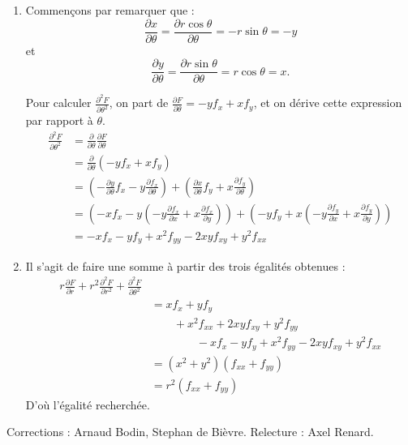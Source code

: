 \documentclass[11pt,a4paper]{article}
\theoremstyle{exostyle}
\begin{document}
\begin{enumerate}
	
	\item 
	Commençons par remarquer que :
	\[\frac{\partial x}{\partial \theta} = \frac{\partial r\cos\theta}{\partial \theta} = -r\sin\theta = -y\]
	et 
	\[\frac{\partial y}{\partial \theta} = \frac{\partial r\sin\theta}{\partial \theta} = r\cos\theta = x.\]
	
	
	
	Pour calculer $\frac{\partial^2 F}{\partial \theta^2}$, on part de $\frac{\partial F}{\partial \theta} = -y f_x+x f_y$, et on dérive cette expression par rapport à $\theta$.
	\begin{align*}
		\frac{\partial^2 F}{\partial \theta^2}
		&= 	\frac{\partial }{\partial \theta} \frac{\partial F}{\partial \theta} \\
		&= \frac{\partial }{\partial \theta} \left( -y f_x + x f_y  \right) \\
		&= \left( -\frac{\partial y}{\partial \theta} f_x  -y\frac{\partial f_x}{\partial \theta} \right) + 
		\left( \frac{\partial x}{\partial \theta} f_y  + x\frac{\partial f_y}{\partial \theta} \right) \\
		&= \left( -x f_x  -y\left( -y \frac{\partial f_x}{\partial x}+x\frac{\partial f_x}{\partial y} \right)\right) + 
\left( -y f_y  + x\left( -y \frac{\partial f_y}{\partial x}+x\frac{\partial f_y}{\partial y} \right) \right) \\		
		&= -x f_x -y f_y + x^2 f_{yy} - 2xyf_{xy} + y^2 f_{xx}
	\end{align*}
	
	

	
	\item Il s'agit de faire une somme à partir des trois égalités obtenues :
	\begin{align*}	
	r\frac{\partial F}{\partial r} + r^2 \frac{\partial^2F}{\partial r^2} + \frac{\partial^2 F}{\partial \theta^2} \\
	&= 
	xf_x + yf_y \\
	&\qquad + x^2 f_{xx} + 2xy f_{xy} + y^2 f_{yy} \\
	&\qquad \qquad -x f_x -y f_y + x^2 f_{yy} - 2xyf_{xy} + y^2 f_{xx} \\
	&= (x^2+y^2)(f_{xx}+f_{yy}) \\
	&= r^2 (f_{xx}+f_{yy})
	\end{align*}
	D'où l'égalité recherchée.
	
\end{enumerate}
\fincorrection
\finexercice


\bigskip

Corrections : Arnaud Bodin, Stephan de Bièvre. Relecture : Axel Renard.
\end{document}
